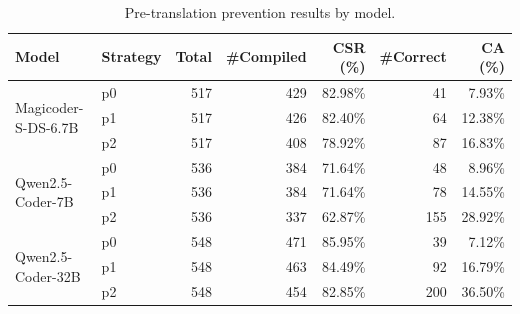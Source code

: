 \begin{table}[t]
\centering
\caption{Pre-translation prevention results by model.}
\label{tab:pre_model}
\begin{tabular}{llrrrrr}
\toprule
Model & Strategy & Total & \#Compiled & CSR (\%) & \#Correct & CA (\%) \\
\midrule
\multirow{3}{*}{Magicoder-S-DS-6.7B}
 &p0 & 517 & 429 & 82.98\% & 41 & 7.93\% \\
 &p1 & 517 & 426 & 82.40\% & 64 & 12.38\% \\
 &p2 & 517 & 408 & 78.92\% & 87 & 16.83\% \\
\midrule
\multirow{3}{*}{Qwen2.5-Coder-7B}
 & p0 & 536 & 384 & 71.64\% & 48 & 8.96\% \\
 & p1 & 536 & 384 & 71.64\% & 78 & 14.55\% \\
 & p2 & 536 & 337 & 62.87\% & 155 & 28.92\% \\
\midrule
\multirow{3}{*}{Qwen2.5-Coder-32B}
 & p0 & 548 & 471 & 85.95\% & 39 & 7.12\% \\
& p1 & 548 & 463 & 84.49\% & 92 & 16.79\% \\
 & p2 & 548 & 454 & 82.85\% & 200 & 36.50\% \\
\bottomrule
\end{tabular}
\end{table}
